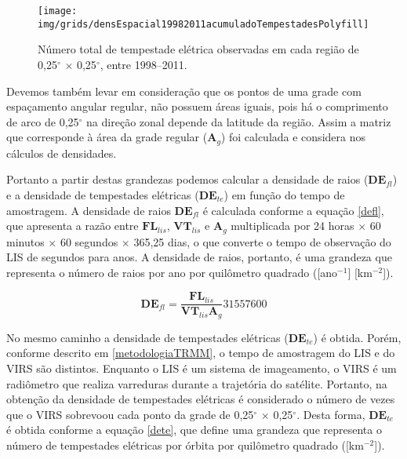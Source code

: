 \begin{figure}[!ht]
  \centering 
  {{\texttt{[image: img/grids/densEspacial19982011acumuladoTempestadesPolyfill]}}}
\caption{Número  total de tempestade elétrica observadas em cada região de 0,25$^{\circ}$  $\times$ 0,25$^{\circ}$,  entre 1998--2011.}
\label{taxaTotalTe}
\end{figure} 

Devemos também levar em consideração que os pontos de uma grade com espaçamento angular regular, não possuem áreas iguais, pois há  o comprimento de arco de 0,25$^{\circ}$ na direção zonal depende da latitude da região. Assim a matriz que corresponde à área da grade regular ($\mathbf{A}_g$) foi calculada e considera nos cálculos de densidades.

Portanto a partir destas grandezas podemos calcular a densidade de raios ($\mathbf{DE}_{fl}$) e a densidade de tempestades elétricas ($\mathbf{DE}_{te}$) em função do tempo de amostragem. A densidade de raios $\mathbf{DE}_{fl}$ é calculada conforme a equação \ref{defl}, que apresenta a razão entre $\mathbf{FL}_{lis}$, $\mathbf{VT}_{lis}$ e $\mathbf{A}_g$ multiplicada por 24 horas $\times$ 60 minutos $\times$ 60 segundos $\times$ 365,25 dias, o que converte o tempo de observação do LIS de segundos para anos. A densidade de raios, portanto, é uma grandeza que representa o número de raios por ano por quilômetro quadrado ([ano$^{-1}$] [km$^{-2}$]).

\begin{equation}
\mathbf{DE}_{fl} = \frac{\mathbf{FL}_{lis}}{\mathbf{VT}_{lis} \mathbf{A}_g} 31557600     
\label{defl}
\end{equation}


No mesmo caminho a densidade de tempestades elétricas ($\mathbf{DE}_{te}$) é obtida. Porém, conforme descrito em \ref{metodologiaTRMM}, o tempo de amostragem do LIS e do VIRS são distintos. Enquanto o LIS é um sistema de imageamento, o VIRS é um radiômetro que realiza varreduras durante a trajetória do satélite. Portanto, na obtenção da densidade de tempestades elétricas é considerado o número de vezes que o VIRS sobrevoou cada ponto da grade de 0,25$^{\circ}$  $\times$ 0,25$^{\circ}$. Desta forma, $\mathbf{DE}_{te}$ é obtida conforme a equação \ref{dete}, que define uma grandeza que representa o número de tempestades elétricas por órbita por quilômetro quadrado ([km$^{-2}$]).

